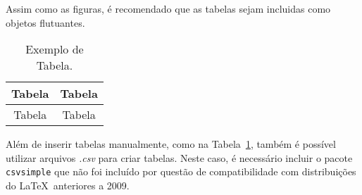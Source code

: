 Assim como as figuras, é recomendado que as tabelas sejam incluidas como
objetos flutuantes.
\begin{table}[!htb]
\caption{Exemplo de Tabela.}
\label{tab:exem}
\centering
\begin{tabular}{cc}
\toprule
Tabela & Tabela \\
\midrule
Tabela & Tabela \\
\bottomrule
\end{tabular}
\end{table}

Além de inserir tabelas manualmente, como na Tabela~\ref{tab:exem}, também é possível utilizar arquivos
\emph{.csv} para criar tabelas. Neste caso, é necessário incluir o pacote
\texttt{csvsimple} que não foi incluído por questão de compatibilidade com
distribuições do \LaTeX \ anteriores a 2009.
